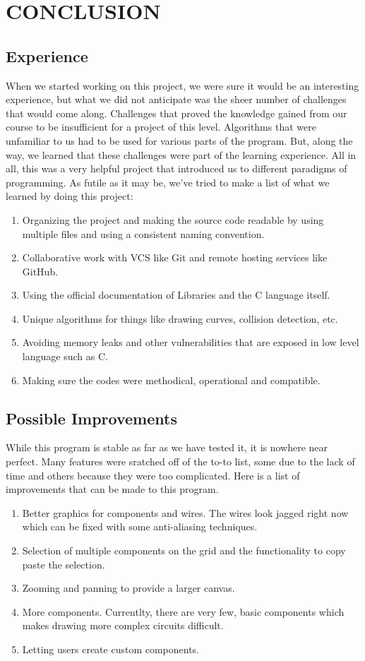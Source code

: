 \documentclass[report]{subfiles}
\begin{document}
    \chapter{CONCLUSION}
    	\section{Experience}
	When we started working on this project, we were sure it would be an interesting experience, but what we did not anticipate was the sheer number of challenges that would come along. Challenges that proved the knowledge gained from our course to be insufficient for a project of this level. Algorithms that were unfamiliar to us had to be used for various parts of the program. But, along the way, we learned that these challenges were part of the learning experience. All in all, this was a very helpful project that introduced us to different paradigms of programming.
As futile as it may be, we've tried to make a list of what we learned by doing this project:
    \begin{enumerate}
        \item{Organizing the project and making the source code readable by using multiple files and using a consistent naming convention.}
        \item{Collaborative work with VCS like Git and remote hosting services like GitHub.}
        \item{Using the official documentation of Libraries and the C language itself.}
        \item{Unique algorithms for things like drawing curves, collision detection, etc.}
        \item{Avoiding memory leaks and other vulnerabilities that are exposed in low level language such as C.}
        \item{Making sure the codes were methodical, operational and compatible.}
    \end{enumerate}
    
    	\section{Possible Improvements}
	While this program is stable as far as we have tested it, it is nowhere near perfect. Many features were sratched off of the to-to list, some due to the lack of time and others because they were too complicated. Here is a list of improvements that can be made to this program.
    \begin{enumerate}
    	\item{Better graphics for components and wires. The wires look jagged right now which can be fixed with some anti-aliasing techniques.}
	\item{Selection of multiple components on the grid and the functionality to copy paste the selection.}
	\item{Zooming and panning to provide a larger canvas.}
	\item{More components. Currentlty, there are very few, basic components which makes drawing more complex circuits difficult.}
	\item{Letting users create custom components.}
    \end{enumerate}
\end{document}
